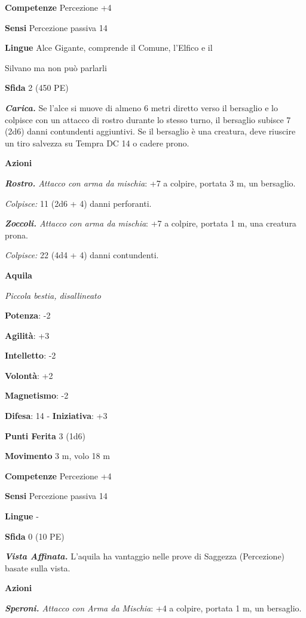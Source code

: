 \begin{multicols}{2}
\textbf{Competenze} Percezione +4

\textbf{Sensi} Percezione passiva 14

\textbf{Lingue} Alce Gigante, comprende il Comune, l'Elfico e il

Silvano ma non può parlarli

\textbf{Sfida} 2 (450 PE)\smallskip

\emph{\textbf{Carica.}} Se l'alce si muove di almeno 6 metri diretto
verso il bersaglio e lo colpisce con un attacco di rostro durante lo
stesso turno, il bersaglio subisce 7 (2d6) danni contundenti aggiuntivi.
Se il bersaglio è una creatura, deve riuscire un tiro salvezza su Tempra
DC 14 o cadere prono.

\smallskip\textbf{Azioni}

\emph{\textbf{Rostro.} Attacco con arma da mischia}: +7 a colpire,
portata 3 m, un bersaglio.

\emph{Colpisce:} 11 (2d6 + 4) danni perforanti.

\emph{\textbf{Zoccoli.} Attacco con arma da mischia}: +7 a colpire,
portata 1 m, una creatura prona.

\emph{Colpisce:} 22 (4d4 + 4) danni contundenti.

\textbf{Aquila}

\emph{Piccola bestia, disallineato}

\textbf{Potenza}: -2

\textbf{Agilità}: +3

\textbf{Intelletto}: -2

\textbf{Volontà}: +2

\textbf{Magnetismo}: -2

\textbf{Difesa}: 14 - \textbf{Iniziativa}: +3

\textbf{Punti Ferita} 3 (1d6)

\textbf{Movimento} 3 m, volo 18 m

\textbf{Competenze} Percezione +4

\textbf{Sensi} Percezione passiva 14

\textbf{Lingue} -

\textbf{Sfida} 0 (10 PE)\smallskip

\emph{\textbf{Vista Affinata.}} L'aquila ha vantaggio nelle prove di
Saggezza (Percezione) basate sulla vista.

\smallskip\textbf{Azioni}

\emph{\textbf{Speroni.} Attacco con Arma da Mischia}: +4 a colpire,
portata 1 m, un bersaglio.


\end{multicols}
